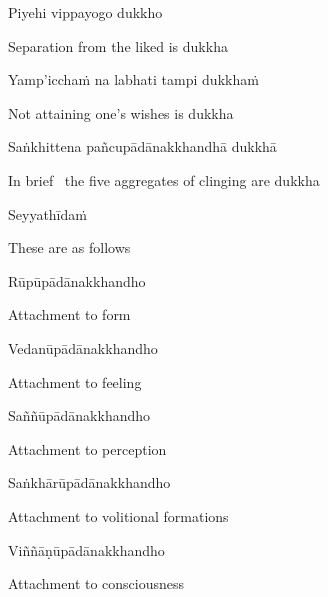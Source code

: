 Piyehi vippayogo dukkho

\begin{english}
  Separation from the liked is dukkha
\end{english}

Yamp'icchaṁ na labhati tampi dukkhaṁ

\begin{english}
  Not attaining one's wishes is dukkha
\end{english}

Saṅkhittena pañcupādānakkhandhā dukkhā

\begin{english}
  In brief \breathmark\ the five aggregates of clinging are dukkha\hyperlink{endnote15-appendix}{\hypertarget{endnote15-body}{}}
\end{english}

Seyyathīdaṁ

\begin{english}
  These are as follows
\end{english}

Rūpūpādānakkhandho

\begin{english}
  Attachment to form
\end{english}

Vedanūpādānakkhandho

\begin{english}
  Attachment to feeling
\end{english}

Saññūpādānakkhandho

\begin{english}
  Attachment to perception
\end{english}

Saṅkhārūpādānakkhandho

\begin{english}
  Attachment to volitional formations\hyperlink{endnote16-appendix}{\hypertarget{endnote16-body}{}}
\end{english}

Viññāṇūpādānakkhandho

\begin{english}
  Attachment to consciousness\hyperlink{endnote17-appendix}{\hypertarget{endnote17-body}{}}
\end{english}

